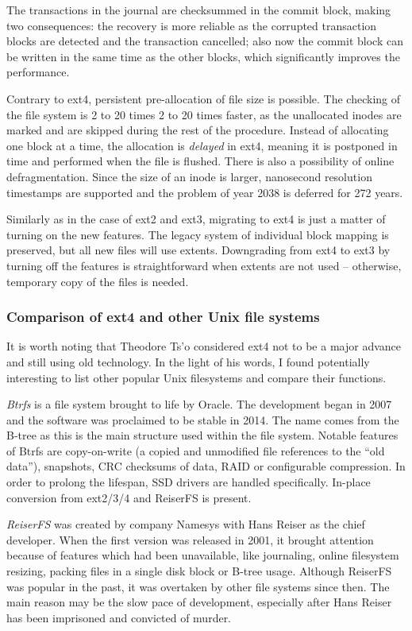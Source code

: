\documentclass{acm_proc_article-sp}
\begin{document}
The transactions in the journal are checksummed in the commit block, making two consequences: the recovery is more reliable as the corrupted transaction blocks are detected and the transaction cancelled; also now the commit block can be written in the same time as the other blocks, which significantly improves the performance.

Contrary to ext4, persistent pre-allocation of file size is possible. The checking of the file system is 2 to 20 times 2 to 20 times faster, as the unallocated inodes are marked and are skipped during the rest of the procedure. Instead of allocating one block at a time, the allocation is {\it delayed} in ext4, meaning it is postponed in time and performed when the file is flushed. There is also a possibility of online defragmentation. Since the size of an inode is larger, nanosecond resolution timestamps are supported and the problem of year 2038 is deferred for 272 years.

Similarly as in the case of ext2 and ext3, migrating to ext4 is just a matter of turning on the new features. The legacy system of individual block mapping is preserved, but all new files will use extents. Downgrading from ext4 to ext3 by turning off the features is straightforward when extents are not used -- otherwise, temporary copy of the files is needed.

\subsubsection{Comparison of ext4 and other Unix file systems}

It is worth noting that Theodore Ts'o considered ext4 not to be a major advance and still using old technology. In the light of his words, I found potentially interesting to list other popular Unix filesystems and compare their functions.

{\it Btrfs} \cite{btrfs} is a file system brought to life by Oracle. The development began in 2007 and the software was proclaimed to be stable in 2014. The name comes from the B-tree as this is the main structure used within the file system. Notable features of Btrfs are copy-on-write (a copied and unmodified file references to the ``old data''), snapshots, CRC checksums of data, RAID or configurable compression. In order to prolong the lifespan, SSD drivers are handled specifically. In-place conversion from ext2/3/4 and ReiserFS is present.

{\it ReiserFS} was created by company Namesys with Hans Reiser as the chief developer. When the first version was released in 2001, it brought attention because of features which had been unavailable, like journaling, online filesystem resizing, packing files in a single disk block or B-tree usage. Although ReiserFS was popular in the past, it was overtaken by other file systems since then. The main reason may be the slow pace of development, especially after Hans Reiser has been imprisoned and convicted of murder.
\end{document}
